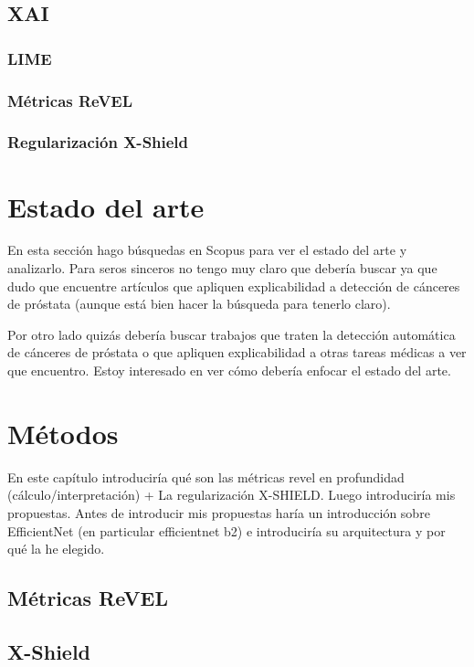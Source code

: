 \section{XAI}

\subsection{LIME}

\subsection{Métricas ReVEL}

\subsection{Regularización X-Shield}


\newpage
\chapter{Estado del arte} \label{cap:eda}


En esta sección hago búsquedas en Scopus para ver el estado del arte y analizarlo. Para seros sinceros no tengo muy claro que debería buscar ya que dudo que encuentre artículos que apliquen explicabilidad a detección de cánceres de próstata (aunque está bien hacer la búsqueda para tenerlo claro). 

Por otro lado quizás debería buscar trabajos que traten la detección automática de cánceres de próstata o que apliquen explicabilidad a otras tareas médicas a ver que encuentro. Estoy interesado en ver cómo debería enfocar el estado del arte.

\newpage
\chapter{Métodos} \label{cap:met}
En este capítulo introduciría qué son las métricas revel en profundidad (cálculo/interpretación) + La regularización X-SHIELD. Luego introduciría mis propuestas. Antes de introducir mis propuestas haría un introducción sobre EfficientNet (en particular efficientnet b2) e introduciría su arquitectura y por qué la he elegido.

\section{Métricas ReVEL} \label{sec:FSCNet} 
\section{X-Shield} 


